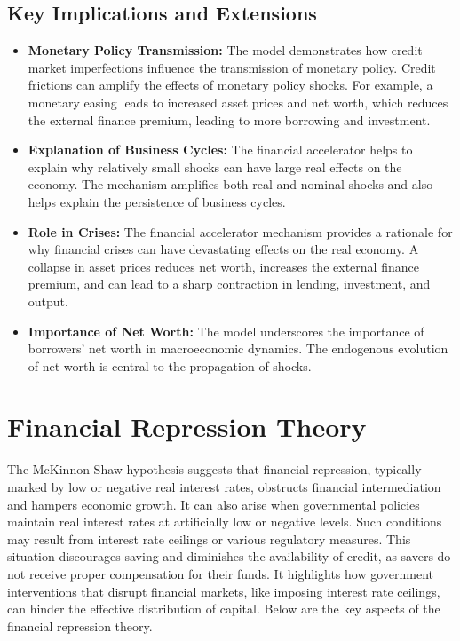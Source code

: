 \subsection{Key Implications and Extensions}
\begin{itemize}
    \item \textbf{Monetary Policy Transmission:} The model demonstrates how credit market imperfections influence the transmission of monetary policy. Credit frictions can amplify the effects of monetary policy shocks. For example, a monetary easing leads to increased asset prices and net worth, which reduces the external finance premium, leading to more borrowing and investment.
    \item \textbf{Explanation of Business Cycles:} The financial accelerator helps to explain why relatively small shocks can have large real effects on the economy. The mechanism amplifies both real and nominal shocks and also helps explain the persistence of business cycles.
    \item \textbf{Role in Crises:} The financial accelerator mechanism provides a rationale for why financial crises can have devastating effects on the real economy. A collapse in asset prices reduces net worth, increases the external finance premium, and can lead to a sharp contraction in lending, investment, and output.
    \item \textbf{Importance of Net Worth:} The model underscores the importance of borrowers' net worth in macroeconomic dynamics. The endogenous evolution of net worth is central to the propagation of shocks.
\end{itemize}

\section{Financial Repression Theory}

The McKinnon-Shaw hypothesis suggests that financial repression, typically marked by low or negative real interest rates, obstructs financial intermediation and hampers economic growth. It can also arise when governmental policies maintain real interest rates at artificially low or negative levels. Such conditions may result from interest rate ceilings or various regulatory measures. This situation discourages saving and diminishes the availability of credit, as savers do not receive proper compensation for their funds. It highlights how government interventions that disrupt financial markets, like imposing interest rate ceilings, can hinder the effective distribution of capital. Below are the key aspects of the financial repression theory.

